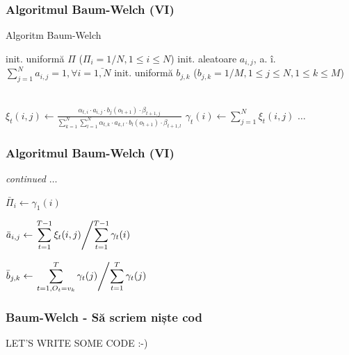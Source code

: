 \begin{frame}[fragile, t]
	\frametitle{Algoritmul Baum-Welch (VI)}	
	\begin{algorithm}[H]
		\scriptsize
      	\caption{Algoritm Baum-Welch}
      	\label{alg-baum-welch}
      	 
      	\begin{algorithmic}[1]
      		\STATE init. uniformă $\Pi$ ($\Pi_i = 1/N, 1 \le i \le N$)
      		\STATE init. aleatoare $a_{i,j}$, a. î. $\sum_{j=1}^{N}a_{i,j} = 1, \forall{i} = \bar{1, N}$ 
      		\STATE init. uniformă $b_{j,k}$ ($b_{j,k} = 1/M, 1 \le j \le N, 1 \le k \le M$)
      		
      		\REPEAT
      			\\
							\STATE $\xi_t(i,j) \leftarrow 
								\frac{\alpha_{t,i}\cdot a_{i,j} \cdot b_j(o_{t+1}) \cdot \beta_{t+1,j}}
									{\displaystyle\sum_{k=1}^{N}\displaystyle\sum_{l=1}^{N}
		        					\alpha_{t,k}\cdot a_{k,l} \cdot b_l(o_{t+1}) \cdot \beta_{t+1,l}}$
	      				\ENDFOR
	      				\STATE $\gamma_t(i) \leftarrow \displaystyle\sum_{j=1}^{N}\xi_t(i,j)$
	      			\ENDFOR
      			\ENDFOR
      			\STATE $\dots$
      	 	\UNTIL{$\dots$}
		\end{algorithmic}
	\end{algorithm}  
\end{frame}

\begin{frame}[fragile, t]
	\frametitle{Algoritmul Baum-Welch (VI)}		
	\begin{algorithm}[H]
		\scriptsize
		\label{alg-baum-welch-2}
      	 
		\begin{algorithmic}[1]
			\REPEAT
				\STATE \emph{continued} $ \dots $ 
				
					\STATE $\bar{\Pi}_i \leftarrow \gamma_1(i)$
				\ENDFOR
				
						\STATE $\bar{a}_{i,j} \leftarrow \left. \displaystyle\sum_{t=1}^{T-1}\xi_t(i,j)
														 \middle/
				   										\displaystyle\sum_{t=1}^{T-1}\gamma_t(i) \right. $
					\ENDFOR
				\ENDFOR
				
						\STATE $\bar{b}_{j,k} \leftarrow \left. \displaystyle\sum_{t=1, O_t = v_k}^{T}\gamma_t(j)
														\middle/				   									
				   										\displaystyle\sum_{t=1}^{T}\gamma_t(j) \right.$
					\ENDFOR
				\ENDFOR			
      	\end{algorithmic}
	\end{algorithm}   
\end{frame}


\begin{frame}
	\frametitle{Baum-Welch - Să scriem niște cod}
	\centering
	LET'S WRITE SOME CODE :-)
\end{frame}